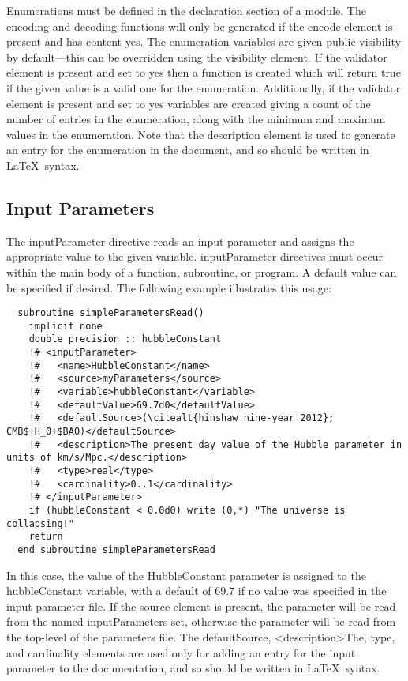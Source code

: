 Enumerations must be defined in the declaration section of a {\normalfont \ttfamily module}. The encoding and decoding functions will only be generated if the {\normalfont \ttfamily encode} element is present and has content {\normalfont \ttfamily yes}. The enumeration variables are given {\normalfont \ttfamily public} visibility by default---this can be overridden using the {\normalfont \ttfamily visibility} element. If the {\normalfont \ttfamily validator} element is present and set to {\normalfont \ttfamily yes} then a function is created which will return true if the given value is a valid one for the enumeration. Additionally, if the {\normalfont \ttfamily validator} element is present and set to {\normalfont \ttfamily yes} variables are created giving a count of the number of entries in the enumeration, along with the minimum and maximum values in the enumeration. Note that the {\normalfont \ttfamily description} element is used to generate an entry for the enumeration in the document, and so should be written in \LaTeX\ syntax.

\subsection{Input Parameters}

The {\normalfont \ttfamily inputParameter} directive reads an input parameter and assigns the appropriate value to the given variable. {\normalfont \ttfamily inputParameter} directives must occur within the main body of a function, subroutine, or program. A default value can be specified if desired. The following example illustrates this usage:

\begin{lstlisting}
  subroutine simpleParametersRead()
    implicit none
    double precision :: hubbleConstant
    !# <inputParameter>
    !#   <name>HubbleConstant</name>
    !#   <source>myParameters</source>
    !#   <variable>hubbleConstant</variable>
    !#   <defaultValue>69.7d0</defaultValue>
    !#   <defaultSource>(\citealt{hinshaw_nine-year_2012}; CMB$+H_0+$BAO)</defaultSource>
    !#   <description>The present day value of the Hubble parameter in units of km/s/Mpc.</description>
    !#   <type>real</type>
    !#   <cardinality>0..1</cardinality>
    !# </inputParameter>
    if (hubbleConstant < 0.0d0) write (0,*) "The universe is collapsing!"
    return
  end subroutine simpleParametersRead
\end{lstlisting}

In this case, the value of the {\normalfont \ttfamily HubbleConstant} parameter is assigned to the {\normalfont \ttfamily hubbleConstant} variable, with a default of $69.7$ if no value was specified in the input parameter file. If the {\normalfont \ttfamily source} element is present, the parameter will be read from the named {\normalfont \ttfamily inputParameters} set, otherwise the parameter will be read from the top-level of the parameters file. The {\normalfont \ttfamily defaultSource}, {\normalfont \ttfamily <description>The}, {\normalfont \ttfamily type}, and {\normalfont \ttfamily cardinality} elements are used only for adding an entry for the input parameter to the documentation, and so should be written in \LaTeX\ syntax.


